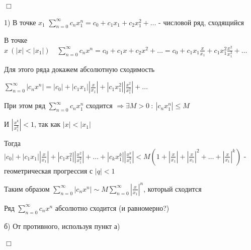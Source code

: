 \documentclass[12pt]{article}
\begin{document}
    \begin{MyProof}
        $\Box$

        1) В точке $x_1$ $\sum_{n = 0}^\infty c_n x_1^n = c_0 + c_1 x_1 + c_2 x_1^2 + \dots$ - числовой ряд, сходящийся

        В точке $x \ (|x| < |x_1|) \quad \sum_{n = 0}^\infty c_n x^n = c_0 + c_1 x + c_2 x^2 + \dots = 
        c_0 + c_1 x_1 \frac{x}{x_1} + c_1 x_1^2 \frac{x^2}{x_1^2} + \dots$ 

        Для этого ряда докажем абсолютную сходимость

        $\sum_{n = 0}^\infty |c_n x^n| = |c_0| + |c_1 x_1| \left|\frac{x}{x_1}\right| + |c_1 x_1^2| \left|\frac{x^2}{x_1^2}\right| + \dots$

        При этом ряд $\sum_{n = 0}^\infty c_n x_1^n$ сходится $\Longrightarrow \exists M > 0 \ : \ |c_n x_1^n| \leq M$

        И $\left|\frac{x^k}{x_1^k}\right| < 1$, так как $|x| < |x_1|$

        Тогда $|c_0| + |c_1 x_1| \left|\frac{x}{x_1}\right| + |c_1 x_1^2| \left|\frac{x^2}{x_1^2}\right| + \dots + |c_k x_1^k| \left|\frac{x^k}{x_1^k}\right| < 
        M\left(1 + \left|\frac{x}{x_1}\right| + \left|\frac{x}{x_1}\right|^2 + \dots + \left|\frac{x}{x_1}\right|^k\right)$ - геометрическая прогрессия с $|q| < 1$

        Таким образом $\sum_{n = 0}^\infty |c_n x^n| \sim M\sum_{n = 0}^\infty \left|\frac{x}{x_1}\right|^n$, который сходится

        Ряд $\sum_{n = 0}^\infty c_n x^n$ абсолютно сходится (и равномерно?)

        б) От противного, используя пункт а)

        $\Box$
    \end{MyProof}

    \smallvspace
\end{document}
